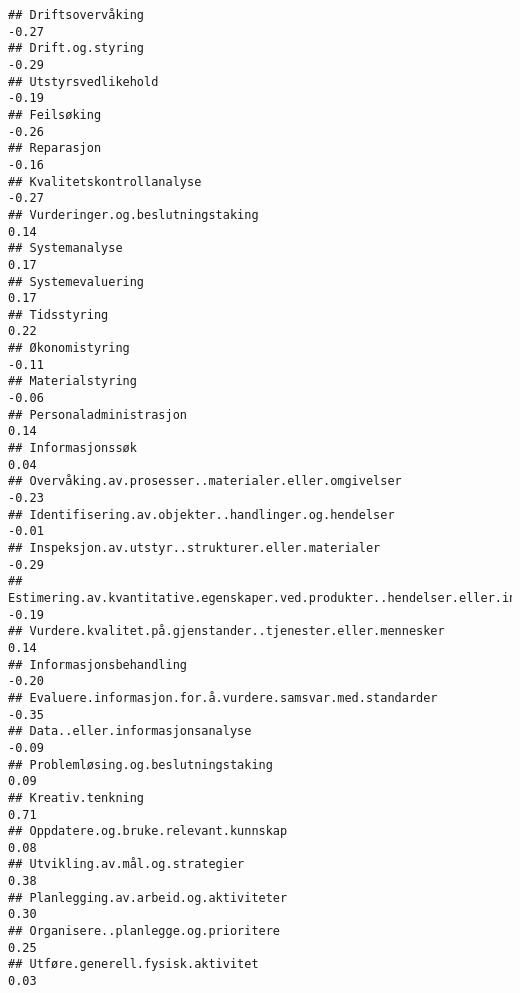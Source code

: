 \documentclass[
]{article}
\begin{document}
\begin{verbatim}
## Driftsovervåking                                                                 -0.27
## Drift.og.styring                                                                 -0.29
## Utstyrsvedlikehold                                                               -0.19
## Feilsøking                                                                       -0.26
## Reparasjon                                                                       -0.16
## Kvalitetskontrollanalyse                                                         -0.27
## Vurderinger.og.beslutningstaking                                                  0.14
## Systemanalyse                                                                     0.17
## Systemevaluering                                                                  0.17
## Tidsstyring                                                                       0.22
## Økonomistyring                                                                   -0.11
## Materialstyring                                                                  -0.06
## Personaladministrasjon                                                            0.14
## Informasjonssøk                                                                   0.04
## Overvåking.av.prosesser..materialer.eller.omgivelser                             -0.23
## Identifisering.av.objekter..handlinger.og.hendelser                              -0.01
## Inspeksjon.av.utstyr..strukturer.eller.materialer                                -0.29
## Estimering.av.kvantitative.egenskaper.ved.produkter..hendelser.eller.informasjon -0.19
## Vurdere.kvalitet.på.gjenstander..tjenester.eller.mennesker                        0.14
## Informasjonsbehandling                                                           -0.20
## Evaluere.informasjon.for.å.vurdere.samsvar.med.standarder                        -0.35
## Data..eller.informasjonsanalyse                                                  -0.09
## Problemløsing.og.beslutningstaking                                                0.09
## Kreativ.tenkning                                                                  0.71
## Oppdatere.og.bruke.relevant.kunnskap                                              0.08
## Utvikling.av.mål.og.strategier                                                    0.38
## Planlegging.av.arbeid.og.aktiviteter                                              0.30
## Organisere..planlegge.og.prioritere                                               0.25
## Utføre.generell.fysisk.aktivitet                                                  0.03

\end{verbatim}
\end{document}
